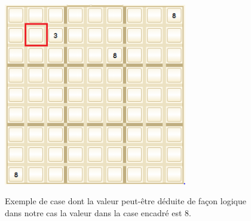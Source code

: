 \begin{figure}[h]
  \begin{center}
\includegraphics[width=8cm]{./images/Exemple_deduction.png}\label{Exemple_Logique}
\caption{Exemple de case dont la valeur peut-être déduite de façon logique dans notre cas la valeur dans la case encadré est 8.}
\end{center}
\end{figure}
